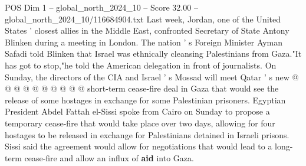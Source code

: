 \begin{textsample}{POS Dim 1 – global\_north\_2024\_10 – Score 32.00 – global\_north\_2024\_10/116684904.txt}
Last week, Jordan, one of the United States ' closest allies in the Middle East, confronted Secretary of State Antony Blinken during a meeting in London.
The nation ' s Foreign Minister Ayman Safadi told Blinken that Israel was ethnically cleansing Palestinians from Gaza."It has got to stop,"he told the American delegation in front of journalists.
On Sunday, the directors of the CIA and Israel ' s Mossad will meet Qatar ' s new @ @ @ @ @ @ @ @ @ @ short-term cease-fire deal in Gaza that would see the release of some hostages in exchange for some Palestinian prisoners.
Egyptian President Abdel Fattah el-Sissi spoke from Cairo on Sunday to propose a temporary cease-fire that would take place over two days, allowing for four hostages to be released in exchange for Palestinians detained in Israeli prisons.
Sissi said the agreement would allow for negotiations that would lead to a long-term cease-fire and allow an influx of \textbf{aid} into Gaza.

\end{textsample}
